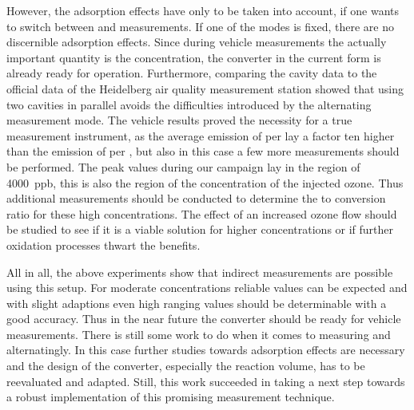 However, the adsorption effects have only to be taken into account, if
one wants to switch between  and  measurements. If
one of the modes is fixed, there are no discernible adsorption
effects. Since during vehicle measurements the actually important
quantity is the  concentration, the converter in the current
form is already ready for operation. Furthermore, comparing the cavity
data to the official data of the Heidelberg air quality measurement
station showed that using two cavities in parallel avoids the
difficulties introduced by the alternating measurement mode. The
vehicle results proved the necessity for a true  measurement
instrument, as the average emission of  per  lay a
factor ten higher than the emission of  per , but also
in this case a few more measurements should be performed. The peak
 values during our campaign lay in the region of
\SI{4000}{ppb}, this is also the region of the concentration of the
injected ozone. Thus additional measurements should be conducted to
determine the  to  conversion ratio for these high
concentrations. The effect of an increased ozone flow should be
studied to see if it is a viable solution for higher concentrations or
if further oxidation processes thwart the benefits.

All in all, the above experiments show that indirect 
measurements are possible using this setup. For moderate
concentrations reliable  values can be expected and with
slight adaptions even high ranging  values should be
determinable with a good accuracy. Thus in the near future the
converter should be ready for  vehicle measurements. There is
still some work to do when it comes to measuring  and
 alternatingly. In this case further studies towards
adsorption effects are necessary and the design of the converter,
especially the reaction volume, has to be reevaluated and
adapted. Still, this work succeeded in taking a next step towards a
robust implementation of this promising measurement technique.

